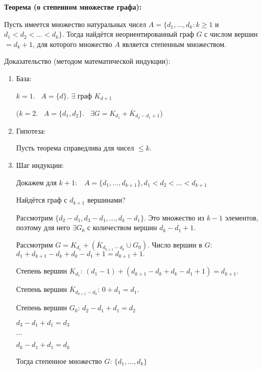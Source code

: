 \textbf{Теорема (о степенном множестве графа):}
    \smallskip

    Пусть имеется множество натуральных чисел $A = \{d_1, \dots, d_k: k \geq 1$ и $
    d_1 < d_2 < \dots < d_k\}$. Тогда найдётся неориентированный граф $G$ с
    числом вершин $= d_k + 1$, для которого множество $A$ является степенным
    множеством.
    \bigskip

    Доказательство (методом математической индукции):
    \bigskip

    \begin{enumerate}
        \item{База:
        \bigskip
        
        $k = 1. \;\;\; A = \{d\}$. $\exists$ граф $K_{d + 1}$
        
        ($k = 2. \;\;\; A = \{d_1, d_2\}. \;\;\; \exists G = K_{d_1} +
        \overline{K}_{d_2 - d_1 + 1}$)}
        \item{Гипотеза:
        \bigskip
        
        Пусть теорема справедлива для чисел $\leq k$.}
        \item{Шаг индукции:
        \bigskip
        
        Докажем для $k + 1: \;\;\; A = \{d_1, \dots, d_{k + 1}\}, 
        d_1 < d_2 < \dots < d_{k + 1}$
        
        Найдётся граф с $d_{k + 1}$ вершинами?
        \bigskip
        
        Рассмотрим $\{d_2 - d_1, d_3 - d_1, \dots, d_k - d_1\}$. Это 
        множество из $k - 1$ элементов, поэтому для него $\exists G_0$
        с количеством вершин $d_k - d_1 + 1$.
        \bigskip
        
        Рассмотрим $G = K_{d_1} + (\overline{K}_{d_{k + 1} - d_k} \cup G_0)$. Число
        вершин в $G$: $d_1 + d_{k + 1} - d_{k} + d_{k} - d_1 + 1 = d_{k + 1} + 1.$
        \bigskip
        
        Степень вершин $K_{d_1}$: $(d_1 - 1) + 
        (d_{k + 1} - d_k + d_k - d_1 + 1) = d_{k + 1}$.
        
        Степень вершин $\overline{K}_{d_{k + 1} - d_k}$: $0 + d_1 = d_1$.
        
        Степень вершин $G_0$: $d_2 - d_1 + d_1 = d_2$
        
        $d_3 - d_1 + d_1 = d_3$
        
        $\dots$
        
        $d_k - d_1 + d_1 = d_k$
        \bigskip
        
        Тогда степенное множество $G$: $\{d_1, \dots, d_k\}$}
    \end{enumerate}

